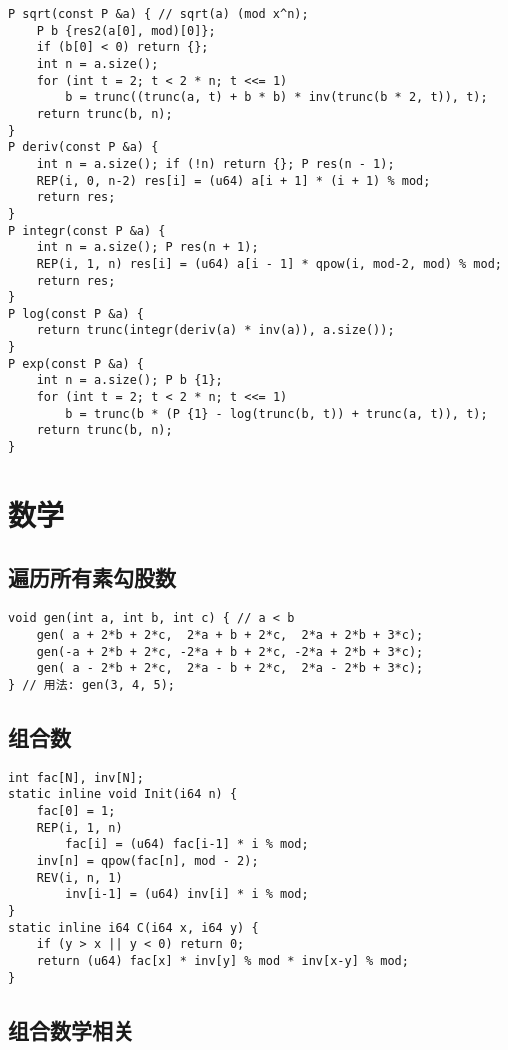 \documentclass[a4paper,landscape,twocolumn]{ctexart}
\begin{document}
\begin{lstlisting}
P sqrt(const P &a) { // sqrt(a) (mod x^n);
	P b {res2(a[0], mod)[0]};
	if (b[0] < 0) return {};
	int n = a.size();
	for (int t = 2; t < 2 * n; t <<= 1)
		b = trunc((trunc(a, t) + b * b) * inv(trunc(b * 2, t)), t);
	return trunc(b, n);
}
P deriv(const P &a) {
	int n = a.size(); if (!n) return {}; P res(n - 1);
	REP(i, 0, n-2) res[i] = (u64) a[i + 1] * (i + 1) % mod;
	return res;
}
P integr(const P &a) {
	int n = a.size(); P res(n + 1);
	REP(i, 1, n) res[i] = (u64) a[i - 1] * qpow(i, mod-2, mod) % mod;
	return res;
}
P log(const P &a) {
	return trunc(integr(deriv(a) * inv(a)), a.size());
}
P exp(const P &a) {
	int n = a.size(); P b {1};
	for (int t = 2; t < 2 * n; t <<= 1)
		b = trunc(b * (P {1} - log(trunc(b, t)) + trunc(a, t)), t);
	return trunc(b, n);
}
\end{lstlisting}

\section{数学}

\subsection{遍历所有素勾股数}

\begin{lstlisting}
void gen(int a, int b, int c) { // a < b
    gen( a + 2*b + 2*c,  2*a + b + 2*c,  2*a + 2*b + 3*c);
    gen(-a + 2*b + 2*c, -2*a + b + 2*c, -2*a + 2*b + 3*c);
    gen( a - 2*b + 2*c,  2*a - b + 2*c,  2*a - 2*b + 3*c);
} // 用法: gen(3, 4, 5);
\end{lstlisting}

\subsection{组合数}

\begin{lstlisting}
int fac[N], inv[N];
static inline void Init(i64 n) {
	fac[0] = 1;
	REP(i, 1, n)
		fac[i] = (u64) fac[i-1] * i % mod;
	inv[n] = qpow(fac[n], mod - 2);
	REV(i, n, 1)
		inv[i-1] = (u64) inv[i] * i % mod;
}
static inline i64 C(i64 x, i64 y) {
	if (y > x || y < 0) return 0;
	return (u64) fac[x] * inv[y] % mod * inv[x-y] % mod;
}
\end{lstlisting}

\subsection{组合数学相关}
\end{document}
